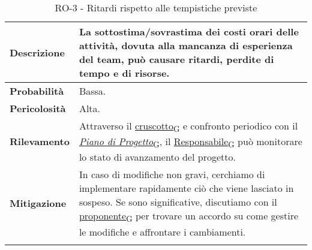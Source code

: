 \begin{longtable}{ | l | p{12cm} | }
	\hline
	\textbf{Descrizione}  & La sottostima/sovrastima dei costi orari delle attività, dovuta alla mancanza di esperienza del team, può causare ritardi, perdite di tempo e di risorse.                                                                                                          \\
	\hline
	\textbf{Probabilità}  & Bassa.                                                                                                                                                                                                                                                             \\
	\hline
	\textbf{Pericolosità} & Alta.                                                                                                                                                                                                                                                              \\
	\hline
	\textbf{Rilevamento}  & Attraverso il \href{https://7last.github.io/docs/rtb/documentazione-interna/glossario\#cruscotto}{cruscotto\textsubscript{G}} e confronto periodico con il \href{https://7last.github.io/docs/rtb/documentazione-interna/glossario#piano-di-progetto}{\textit{Piano di Progetto}\textsubscript{G}}, il \href{https://7last.github.io/docs/rtb/documentazione-interna/glossario\#responsabile}{Responsabile\textsubscript{G}} può monitorare lo stato di avanzamento del progetto. \\
	\hline
	\textbf{Mitigazione}  & In caso di modifiche non gravi, cerchiamo di implementare rapidamente ciò che viene lasciato in sospeso. Se sono significative, discutiamo con il \href{https://7last.github.io/docs/rtb/documentazione-interna/glossario\#proponente}{proponente\textsubscript{G}} per trovare un accordo su come gestire le modifiche e affrontare i cambiamenti.                       \\
	\hline
	\caption{RO-3 - Ritardi rispetto alle tempistiche previste}
\end{longtable}

\newpage


